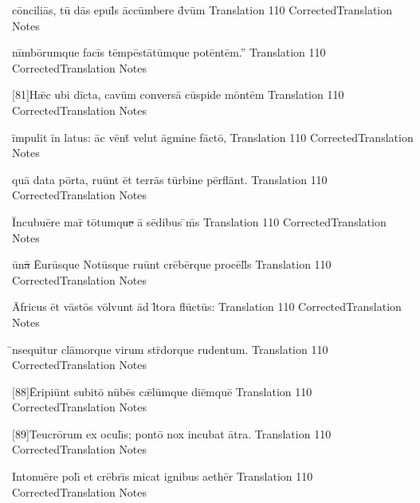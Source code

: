 \documentclass[]{book}
\begin{document}
\latline
  {c\=onc\-il\-i\={\macron a}s, t\={\macron u} d\={\macron a}s \-ep\-ul\={\macron {\i}}s \=acc\=umb\-er\-e d\={\macron {\i}}v\=um
}
  { Translation }
  {110}
  { CorrectedTranslation }
  { Notes }
\newpage

\latline
  {n\=imb\={\macron o}r\-umqu\-e f\-ac\=is t\=emp\=est\={\macron a}t\=umqu\-e p\-ot\=ent\=em.''
}
  { Translation }
  {110}
  { CorrectedTranslation }
  { Notes }


\latline
  {[81]H\={\ae}c \-ub\-i d\=ict\-a, c\-av\=um c\-onv\-ers\={\macron a} c\=usp\-id\-e m\=ont\=em
}
  { Translation }
  {110}
  { CorrectedTranslation }
  { Notes }


\latline
  {\=imp\-ul\-it \=in l\-at\-us:  \=ac v\=ent\={\macron {\i}} v\-el\-ut \=agm\-in\-e f\=act\={\macron o},
}
  { Translation }
  {110}
  { CorrectedTranslation }
  { Notes }

\newpage
\latline
  {qu\={\macron a} d\-at\-a p\=ort\-a, r\-u\=unt \=et t\-err\={\macron a}s t\=urb\-in\-e p\=erfl\=ant.
}
  { Translation }
  {110}
  { CorrectedTranslation }
  { Notes }


\latline
  {\=Inc\-ub\-u\={\macron e}r\-e m\-ar\={\macron {\i}} t\={\macron o}tumqu\sout{e }\={\macron a} s\={\macron e}d\-ib\-us \={\macron {\i}}m\={\macron {\i}}s
}
  { Translation }
  {110}
  { CorrectedTranslation }
  { Notes }


\latline
  {\={\macron u}n\sout{\={\macron a} }\={Eu}r\=usqu\-e N\-ot\=usqu\-e r\-u\=unt cr\={\macron e}b\=erqu\-e pr\-oc\=ell\={\macron {\i}}s
}
  { Translation }
  {110}
  { CorrectedTranslation }
  { Notes }
\newpage

\latline
  {\={\macron A}fr\-ic\-us \=et v\=ast\={\macron o}s v\=olvunt \=ad l\={\macron {\i}}t\-or\-a fl\={\macron u}ct\={\macron u}s:
}
  { Translation }
  {110}
  { CorrectedTranslation }
  { Notes }


\latline
  {\={\macron {\i}}nsequitur cl\={\macron a}morque virum str\={\macron {\i}}dorque rudentum.
}
  { Translation }
  {110}
  { CorrectedTranslation }
  { Notes }

\latline
  {[88]\={\macron E}r\-ip\-i\=unt s\-ub\-it\={\macron o} n\={\macron u}b\={\macron e}s c\={\ae}l\=umqu\-e d\-i\=emqu\=e
}
  { Translation }
  {110}
  { CorrectedTranslation }
  { Notes }


	\latline
	  {[89]Teucr\={\macron o}rum ex ocul\={\macron \i}s; pont\={\macron o} nox incubat \={\macron a}tra.}
	  { Translation }
	  {110}
	  { CorrectedTranslation }
	  { Notes }


	\latline
	  {Intonu\={\macron e}re pol\={\macron \i} et cr\={\macron e}br\={\macron \i}s micat ignibus aeth\={\macron e}r}
	  { Translation }
	  {110}
	  { CorrectedTranslation }
	  { Notes }
\end{document}
